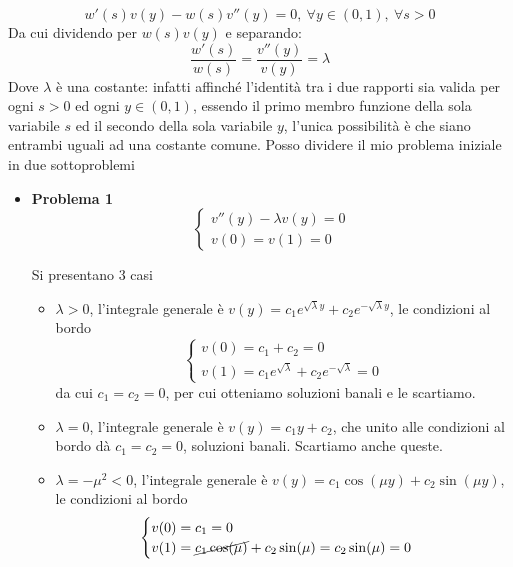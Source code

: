 \documentclass[10pt,a4paper,twoside,openright]{book}
\begin{document}
\begin{equation*}
    w'(s) v(y) -w(s) v'' (y) =0,\ \forall y\in (0,1),\ \forall s >0
\end{equation*}
Da cui dividendo per $\displaystyle w(s) v(y)$ e separando:
\begin{equation*}
    \frac{w'(s)}{w(s)} =\frac{v'' (y)}{v(y)} =\lambda
\end{equation*}
Dove $\displaystyle \lambda $ è una costante: infatti affinché l'identità tra i due rapporti sia valida per ogni $s >0$ ed ogni $\displaystyle y\in (0,1)$, essendo il primo membro funzione della sola variabile $s$ ed il secondo della sola variabile $y$, l'unica possibilità è che siano entrambi uguali ad una costante comune. Posso dividere il mio problema iniziale in due sottoproblemi
\begin{itemize}
    \item \textbf{Problema 1}
          \begin{equation*}
              \begin{cases}
                  v'' (y) -\lambda v(y) =0 \\
                  v(0) =v(1) =0
              \end{cases}
          \end{equation*}

          Si presentano 3 casi
          \begin{itemize}
              \item $\displaystyle \lambda  >0$, l'integrale generale è $\displaystyle v(y) =c_{1} e^{\sqrt{\lambda } y} +c_{2} e^{-\sqrt{\lambda } y}$, le condizioni al bordo
                    \begin{equation*}
                        \begin{cases}
                            v(0) =c_{1} +c_{2} =0 \\
                            v(1) =c_{1} e^{\sqrt{\lambda }} +c_{2} e^{-\sqrt{\lambda }} =0
                        \end{cases}
                    \end{equation*}da cui $\displaystyle c_{1} =c_{2} =0$, per cui otteniamo soluzioni banali e le scartiamo.
              \item $\displaystyle \lambda =0$, l'integrale generale è $\displaystyle v(y) =c_{1} y+c_{2}$, che unito alle condizioni al bordo dà $\displaystyle c_{1} =c_{2} =0$, soluzioni banali. Scartiamo anche queste.
              \item $\displaystyle \lambda =-\mu ^{2} < 0$, l'integrale generale è $\displaystyle v(y) =c_{1}\cos(\mu y) +c_{2}\sin(\mu y)$, le condizioni al bordo
                    \begin{equation*}
                        \begin{cases}
                            v(0) =c_{1} =0 \\
                            v(1) =\cancel{c_{1}\cos(\mu)} +c_{2}\sin(\mu) =c_{2}\sin(\mu) =0
                        \end{cases}
                    \end{equation*}


\end{itemize}
\end{itemize}
\end{document}
